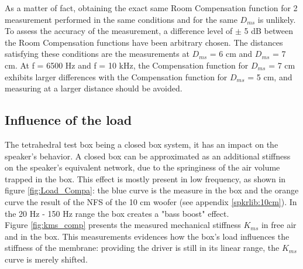 \documentclass{report}
\begin{document}
As a matter of fact, obtaining the exact same Room Compensation function for 2 measurement performed in the same conditions and for the same $D_{ms}$ is unlikely. \\
To assess the accuracy of the measurement, a difference level of $\pm$ 5 dB between the Room Compensation functions have been arbitrary chosen. The distances satisfying these conditions are the measurements at $D_{ms}$ = 6 cm and $D_{ms}$ = 7 cm. At f = 6500 Hz and f = 10 kHz, the Compensation function for $D_{ms}$ = 7 cm exhibits larger differences with the Compensation function for $D_{ms}$ = 5 cm, and measuring at a larger distance should be avoided. 

\subsection{Influence of the load}
\label{sec:load}

The tetrahedral test box being a closed box system, it has an impact on the speaker's behavior. A closed box can be approximated as an additional  stiffness on the speaker's equivalent network, due to the springiness of the air volume trapped in the box. This effect is mostly present in low frequency, as shown in figure \ref{fig:Load_Compa}: the blue curve is the measure in the box and the orange curve the result of the NFS of the 10 cm woofer (see appendix \ref{spkrlib:10cm}). In the 20 Hz - 150 Hz range the box creates a "bass boost" effect. \\
Figure \ref{fig:kms_comp} presents the measured mechanical stiffness $K_{ms}$ in free air and in the box. This measurements evidences how the box's load influences the stiffness of the membrane: providing the driver is still in its linear range, the $K_{ms}$ curve is merely shifted. \\ 
\end{document}
